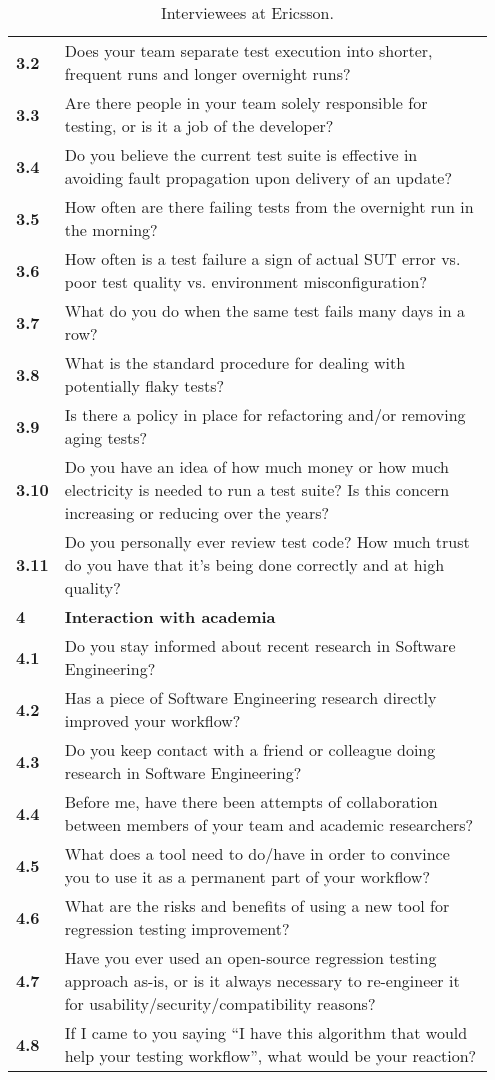 \begin{table}[]
\begin{tabular}{p{0.05\linewidth}p{0.9\linewidth}}
\textbf{3.2} & Does your team separate test execution into shorter, frequent runs and longer overnight runs? \\
\textbf{3.3} & Are there people in your team solely responsible for testing, or is it a job of the developer? \\
\textbf{3.4} & Do you believe the current test suite is effective in avoiding fault propagation upon delivery of an update? \\
\textbf{3.5} & How often are there failing tests from the overnight run in the morning? \\
\textbf{3.6} & How often is a test failure a sign of actual SUT error vs. poor test quality vs. environment misconfiguration? \\
\textbf{3.7} & What do you do when the same test fails many days in a row? \\
\textbf{3.8} & What is the standard procedure for dealing with potentially flaky tests? \\
\textbf{3.9} & Is there a policy in place for refactoring and/or removing aging tests? \\
\textbf{3.10} & Do you have an idea of how much money or how much electricity is needed to run a test suite? Is this concern increasing or reducing over the years? \\
\textbf{3.11} & Do you personally ever review test code? How much trust do you have that it's being done correctly and at high quality? \\
\midrule
\textbf{4} & \textbf{Interaction with academia} \\
\textbf{4.1} & Do you stay informed about recent research in Software Engineering? \\
\textbf{4.2} & Has a piece of Software Engineering research directly improved your workflow? \\
\textbf{4.3} & Do you keep contact with a friend or colleague doing research in Software Engineering? \\
\textbf{4.4} & Before me, have there been attempts of collaboration between members of your team and academic researchers? \\
\textbf{4.5} & What does a tool need to do/have in order to convince you to use it as a permanent part of your workflow? \\
\textbf{4.6} & What are the risks and benefits of using a new tool for regression testing improvement? \\
\textbf{4.7} & Have you ever used an open-source regression testing approach as-is, or is it always necessary to re-engineer it for usability/security/compatibility reasons? \\
\textbf{4.8} & If I came to you saying ``I have this algorithm that would help your testing workflow'', what would be your reaction? \\
\bottomrule
\end{tabular}\\
\caption{Interviewees at Ericsson.}
\label{table:interviewees}
\end{table}